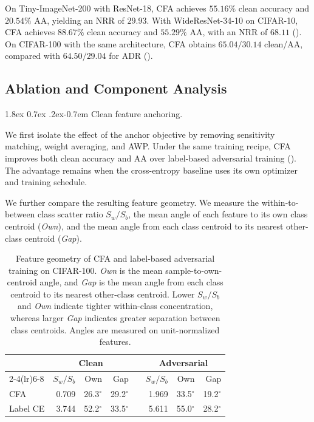 \documentclass{article} %
\makeatletter
\theoremstyle{plain}
\renewcommand{\paragraph}{\@startsection{paragraph}{4}{\z@}%
  {1.8ex \@plus 0.7ex \@minus .2ex}{-0.7em}%
  {\normalfont\normalsize\bfseries}}
\makeatother
\begin{document}
On Tiny-ImageNet-200 with ResNet-18, CFA achieves \(55.16\%\) clean
accuracy and \(20.54\%\) AA, yielding an NRR of \(29.93\). With
WideResNet-34-10 on CIFAR-10, CFA achieves \(88.67\%\) clean accuracy
and \(55.29\%\) AA, with an NRR of \(68.11\)
(). On CIFAR-100 with the same architecture, CFA obtains
\(65.04/30.14\) clean/AA, compared with \(64.50/29.04\) for ADR
().


\subsection{Ablation and Component Analysis}
\label{sec:components}
\paragraph{Clean feature anchoring.}

We first isolate the effect of the anchor objective by removing sensitivity
matching, weight averaging, and AWP. Under the same training recipe, CFA
improves both clean accuracy and AA over label-based adversarial training
(). The advantage remains when the cross-entropy baseline
uses its own optimizer and training schedule.

We further compare the resulting feature geometry. We measure the
within-to-between class scatter ratio \(S_w/S_b\), the mean angle of each
feature to its own class centroid (\emph{Own}), and the mean angle from each
class centroid to its nearest other-class centroid (\emph{Gap}).

\begin{table}[t]
  \centering
  \small
  \setlength{\tabcolsep}{4pt}
  \caption{
  Feature geometry of CFA and label-based adversarial training on CIFAR-100.
  \emph{Own} is the mean sample-to-own-centroid angle, and \emph{Gap} is the
  mean angle from each class centroid to its nearest other-class centroid.
  Lower \(S_w/S_b\) and \emph{Own} indicate tighter within-class
  concentration, whereas larger \emph{Gap} indicates greater separation
  between class centroids. Angles are measured on unit-normalized features.
  }
  \label{tab:anchorgeometry}
  \begin{tabular}{lrrrcrrr}
    \toprule
    & \multicolumn{3}{c}{Clean}
    && \multicolumn{3}{c}{Adversarial} \\
    \cmidrule(lr){2-4}\cmidrule(lr){6-8}
    & \(S_w/S_b\) & Own & Gap
    && \(S_w/S_b\) & Own & Gap \\
    \midrule
    CFA
      & 0.709 & 26.3\(^{\circ}\) & 29.2\(^{\circ}\)
      && 1.969 & 33.5\(^{\circ}\) & 19.2\(^{\circ}\) \\
    Label CE
      & 3.744 & 52.2\(^{\circ}\) & 33.5\(^{\circ}\)
      && 5.611 & 55.0\(^{\circ}\) & 28.2\(^{\circ}\) \\
    \bottomrule
  \end{tabular}
\end{table}
\end{document}
